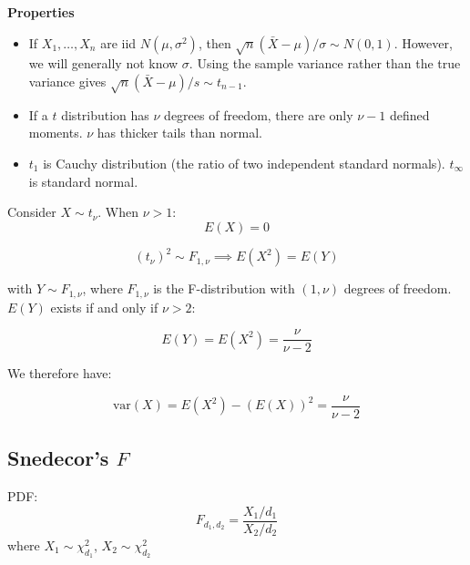 \documentclass[DIV=14,titlepage=false]{scrreprt}
\begin{document}
\textbf{Properties}

\begin{itemize}
  \item If $ X_1, \dotsc, X_n $ are iid $ N (\mu, \sigma^2) $, then $ \sqrt{n} (\bar{X}-\mu) / \sigma \sim N (0,1) $. However, we will generally not know $ \sigma $. Using the sample variance rather than the true variance gives $ \sqrt{n} (\bar{X}-\mu) / s \sim t_{n-1} $.

  \item If a $ t $ distribution has $ \nu $ degrees of freedom, there are only $ \nu-1 $ defined moments. $ \nu $ has thicker tails than normal.
  
  \item$ t_1 $ is Cauchy distribution (the ratio of two independent standard normals). $ t_\infty $ is standard normal.
\end{itemize}

\begin{example}

  Consider $X\sim t_{\nu}$. When \( \nu > 1 \): \[ E(X) = 0 \]
  
  \[ (t_{\nu})^2 \sim F_{1,{\nu}}  \implies E(X^2) = E(Y) \]
  
  with \( Y \sim F_{1,{\nu}} \), where \( F_{1,{\nu}} \) is the F-distribution with \( (1, \nu) \) degrees of freedom. \( E(Y) \) exists if and only if \( \nu > 2 \):
  
  \[ E(Y) = E(X^2) = \frac{\nu}{\nu - 2} \]
  
  We therefore have:
  
  \[ \text{var}(X) = E(X^2) - (E(X))^2 = \frac{\nu}{\nu - 2} \]
  
\end{example}

\subsection*{Snedecor's \( F \)}
PDF: \[ \displaystyle F_{d_1,d_2} = \frac{X_1/d_1}{X_2/d_2}\] where \( X_1 \sim \chi^2_{d_1}\), \( X_2 \sim \chi^2_{d_2}\)
\end{document}
